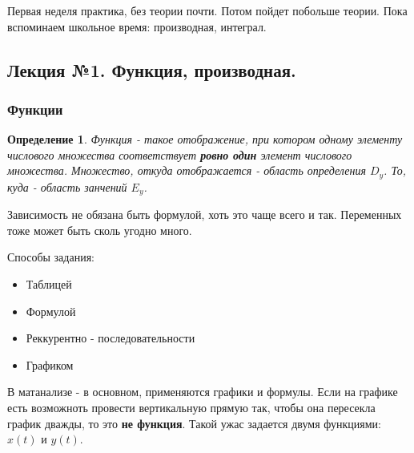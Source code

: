 \documentclass{article}
\newtheorem{theorem}{Определение} %
\begin{document}
Первая неделя практика, без теории почти. Потом пойдет побольше теории. Пока вспоминаем школьное время: производная, интеграл.

\subsection{Лекция №1. Функция, производная.}

\subsubsection{Функции}
\begin{theorem}
Функция - такое отображение, при котором одному элементу числового множества соответствует \textbf{ровно один} элемент числового множества. Множество, откуда отображается - область определения $D_y$. То, куда - область занчений $E_y$.
\end{theorem}

Зависимость не обязана быть формулой, хоть это чаще всего и так. Переменных тоже может быть сколь угодно много.

\large{Способы задания:}
\begin{itemize}
\item{Таблицей}
\item{Формулой}
\item{Реккурентно - последовательности}
\item{Графиком}
\end{itemize}
В матанализе - в основном, применяются графики и формулы. Если на графике  есть возможноть провести вертикальную прямую так, чтобы она пересекла график дважды, то это \textbf{не функция}. Такой ужас задается двумя функциями: $x(t)$ и $y(t)$.	
\end{document}
